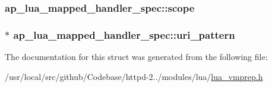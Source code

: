 \subsubsection[{\texorpdfstring{scope}{scope}}]{ ap\+\_\+lua\+\_\+mapped\+\_\+handler\+\_\+spec\+::scope}\hypertarget{structap__lua__mapped__handler__spec_aa66c7647e53efa573082e52b92ecc3d7}{}\label{structap__lua__mapped__handler__spec_aa66c7647e53efa573082e52b92ecc3d7}
\subsubsection[{\texorpdfstring{uri\+\_\+pattern}{uri_pattern}}]{$\ast$ ap\+\_\+lua\+\_\+mapped\+\_\+handler\+\_\+spec\+::uri\+\_\+pattern}\hypertarget{structap__lua__mapped__handler__spec_aeaa55c857b32e7136b4e20db934404ff}{}\label{structap__lua__mapped__handler__spec_aeaa55c857b32e7136b4e20db934404ff}


The documentation for this struct was generated from the following file\+:\begin{DoxyCompactItemize}
\item 
/usr/local/src/github/\+Codebase/httpd-\/2../modules/lua/\hyperlink{lua__vmprep_8h}{lua\+\_\+vmprep.\+h}\end{DoxyCompactItemize}
